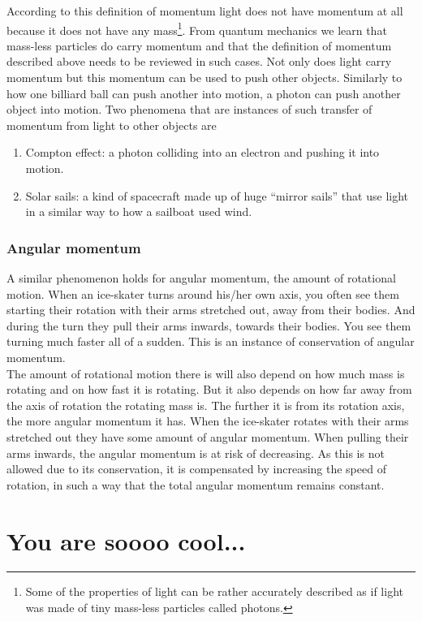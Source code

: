 \noindent According to this definition of momentum light does not have momentum at all because it does not have any mass\footnote{Some of the properties of light can be rather accurately described as if light was made of tiny mass-less particles called photons.}. From quantum mechanics we learn that mass-less particles do carry momentum and that the definition of momentum described above needs to be reviewed in such cases. Not only does light carry momentum but this momentum can be used to push other objects. Similarly to how one billiard ball can push another into motion, a photon can push another object into motion. Two phenomena that are instances of such transfer of momentum from light to other objects are
\begin{enumerate}
\item Compton effect: a photon colliding into an electron and pushing it into motion.
\item Solar sails: a kind of spacecraft made up of huge "`mirror sails"' that use light in a similar way to how a sailboat used wind. 
\end{enumerate}

\subsubsection{Angular momentum}

\noindent A similar phenomenon holds for angular momentum, the amount of rotational motion. When an ice-skater turns around his/her own axis, you often see them starting their rotation with their arms stretched out, away from their bodies. And during the turn they pull their arms inwards, towards their bodies. You see them turning much faster all of a sudden. This is an instance of conservation of angular momentum.\\

\noindent The amount of rotational motion there is will also depend on how much mass is rotating and on how fast it is rotating. But it also depends on how far away from the axis of rotation the rotating mass is. The further it is from its rotation axis, the more angular momentum it has. When the ice-skater rotates with their arms stretched out they have some amount of angular momentum. When pulling their arms inwards, the angular momentum is at risk of decreasing. As this is not allowed due to its conservation, it is compensated by increasing the speed of rotation, in such a way that the total angular momentum remains constant. 

\section{You are soooo cool...}
\label{Temperature_Intro}

